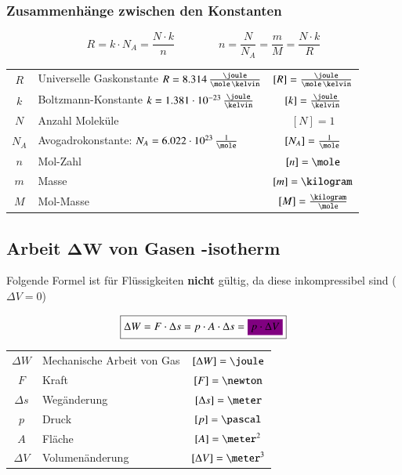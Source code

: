 	
\subsubsection{Zusammenhänge zwischen den Konstanten}
	
\vspace{-0.2cm}

$$ \boxed{ R = k \cdot N_A = \frac{N \cdot k}{n} } \qquad \qquad \boxed{ n = \frac{N}{N_A} = \frac{m}{M} = \frac{N \cdot k}{R} }$$
	

\renewcommand{\arraystretch}{1.3}
\begin{tabular}{c l c}
	$R$		& Universelle Gaskonstante $R = 8.314 \, \frac{\joule}{\mole \, \kelvin}$ 	& $[R] = \frac{\joule}{\mole \, \kelvin}$ 	\\
	$k$		& Boltzmann-Konstante $k = 1.381 \cdot 10^{-23} \, \frac{\joule}{\kelvin}$ 	& $[k] = \frac{\joule}{\kelvin}$			\\
	$N$ 	& Anzahl Moleküle 															& $[N] = 1$ 								\\
	$N_A$ 	& Avogadrokonstante: $N_A = 6.022 \cdot 10^{23} \, \frac{1}{\mole}$ 		& $[N_A] = \frac{1}{\mole}$					\\	
	$n$ 	& Mol-Zahl 																	& $[n] = \mole$ 							\\
	$m$ 	& Masse 																	& $[m] = \kilogram$ 						\\
	$M$ 	& Mol-Masse 																& $[M] = \frac{\kilogram}{\mole}$
\end{tabular}
\renewcommand{\arraystretch}{1}

\subsection[Arbeit von Gasen -isotherm]{Arbeit $\bm{\Delta W}$ von Gasen -isotherm}
\label{MechArbeit}

Folgende Formel ist für Flüssigkeiten \textbf{nicht} gültig, da diese inkompressibel sind ($\Delta V = 0$)

$$ \boxed{ \Delta W = F \cdot \Delta s = p \cdot A \cdot \Delta s = \colorbox{violet}{$p \cdot \Delta V$}} $$


\begin{tabular}{c l c}
	$\Delta W$ 	& Mechanische Arbeit von Gas	& $[\Delta W] = \joule$		\\
	$F$ 		& Kraft 						& $[F] = \newton$ 			\\
	$\Delta s$ 	& Wegänderung 					& $[\Delta s] = \meter$ 	\\
	$p$ 		& Druck 						& $[p] = \pascal$ 			\\
	$A$ 		& Fläche 						& $[A] = \meter^2$ 			\\
	$\Delta V$ 	& Volumenänderung 				& $[\Delta V] = \meter^3$
\end{tabular}


